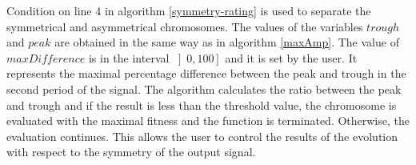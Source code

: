 Condition on line 4 in algorithm \ref{symmetry-rating} is used to separate the symmetrical and asymmetrical chromosomes. The values of the variables $trough$ and $peak$ are obtained in the same way as in algorithm \ref{maxAmp}. The value of $maxDifference$ is in the interval $\left]0, 100\right]$ and it is set by the user. It represents the maximal percentage difference between the peak and trough in the second period of the signal. The algorithm calculates the ratio between the peak and trough and if the result is less than the threshold value, the chromosome is evaluated with the maximal fitness and the function is terminated. Otherwise, the evaluation continues. This allows the user to control the results of the evolution with respect to the symmetry of the output signal.